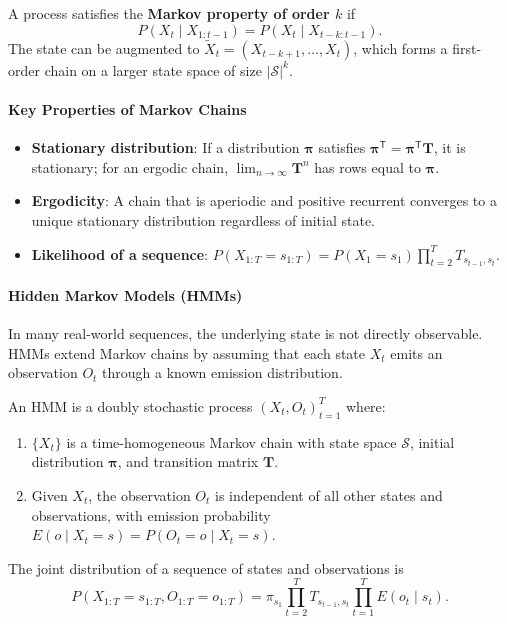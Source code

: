 \documentclass{tufte-handout}
\begin{document}
\begin{defn}
    A process satisfies the \textbf{Markov property of order $k$} if
    \[
    P(X_t \mid X_{1:t-1}) = P(X_t \mid X_{t-k:t-1}).
    \]
    The state can be augmented to $\tilde{X}_t = (X_{t-k+1}, \dots, X_t)$, which forms a first-order chain on a larger state space of size $|\mathcal{S}|^k$.
\end{defn}

\paragraph{Key Properties of Markov Chains}
\begin{itemize}
    \item \textbf{Stationary distribution}: If a distribution $\boldsymbol{\pi}$ satisfies $\boldsymbol{\pi}^{\mathsf{T}} = \boldsymbol{\pi}^{\mathsf{T}} \mathbf{T}$, it is stationary; for an ergodic chain, $\lim_{n\to\infty} \mathbf{T}^n$ has rows equal to $\boldsymbol{\pi}$.
    \item \textbf{Ergodicity}: A chain that is aperiodic and positive recurrent converges to a unique stationary distribution regardless of initial state.
    \item \textbf{Likelihood of a sequence}: $P(X_{1:T}=s_{1:T}) = P(X_1=s_1) \prod_{t=2}^T T_{s_{t-1}, s_t}$.
\end{itemize}

\paragraph{Hidden Markov Models (HMMs)}
In many real-world sequences, the underlying state is not directly observable. HMMs extend Markov chains by assuming that each state $X_t$ emits an observation $O_t$ through a known emission distribution.

\begin{defn}
    An HMM is a doubly stochastic process $(X_t, O_t)_{t=1}^T$ where:
    \begin{enumerate}
        \item $\{X_t\}$ is a time-homogeneous Markov chain with state space $\mathcal{S}$, initial distribution $\boldsymbol{\pi}$, and transition matrix $\mathbf{T}$.
        \item Given $X_t$, the observation $O_t$ is independent of all other states and observations, with emission probability $E(o \mid X_t=s) = P(O_t=o \mid X_t=s)$.
    \end{enumerate}
    The joint distribution of a sequence of states and observations is
    \[
    P(X_{1:T}=s_{1:T}, O_{1:T}=o_{1:T}) = \pi_{s_1} \prod_{t=2}^T T_{s_{t-1}, s_t} \prod_{t=1}^T E(o_t \mid s_t).
    \]
\end{defn}
\end{document}
